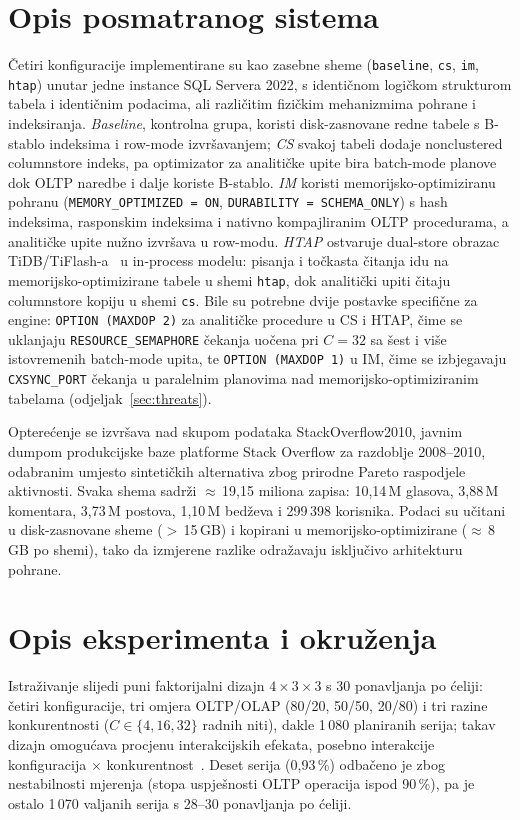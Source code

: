 \documentclass[10pt,conference,a4paper]{IEEEtran}
\begin{document}
\section{Opis posmatranog sistema}
Četiri konfiguracije implementirane su kao zasebne sheme (\texttt{baseline},
\texttt{cs}, \texttt{im}, \texttt{htap}) unutar jedne instance SQL Servera
2022, s identičnom logičkom strukturom tabela i identičnim podacima, ali
različitim fizičkim mehanizmima pohrane i indeksiranja. \emph{Baseline},
kontrolna grupa, koristi disk-zasnovane redne tabele s B-stablo indeksima i
row-mode izvršavanjem; \emph{CS} svakoj tabeli dodaje nonclustered
columnstore indeks, pa optimizator za analitičke upite bira batch-mode
planove dok OLTP naredbe i dalje koriste B-stablo. \emph{IM} koristi
memorijsko-optimiziranu pohranu (\texttt{MEMORY\_OPTIMIZED = ON},
\texttt{DURABILITY = SCHEMA\_ONLY}) s hash indeksima, rasponskim indeksima i
nativno kompajliranim OLTP procedurama, a analitičke upite nužno izvršava u
row-modu. \emph{HTAP} ostvaruje dual-store obrazac TiDB/TiFlash-a~\cite{huang2020}
u in-process modelu: pisanja i točkasta čitanja idu na
memorijsko-optimizirane tabele u shemi \texttt{htap}, dok analitički upiti
čitaju columnstore kopiju u shemi \texttt{cs}. Bile su potrebne dvije
postavke specifične za engine: \texttt{OPTION (MAXDOP 2)} za analitičke
procedure u CS i HTAP, čime se uklanjaju \texttt{RESOURCE\_SEMAPHORE}
čekanja uočena pri $C = 32$ sa šest i više istovremenih batch-mode upita, te
\texttt{OPTION (MAXDOP 1)} u IM, čime se izbjegavaju \texttt{CXSYNC\_PORT}
čekanja u paralelnim planovima nad memorijsko-optimiziranim tabelama
(odjeljak~\ref{sec:threats}).

Opterećenje se izvršava nad skupom podataka StackOverflow2010, javnim dumpom
produkcijske baze platforme Stack Overflow za razdoblje 2008--2010, odabranim
umjesto sintetičkih alternativa zbog prirodne Pareto raspodjele
aktivnosti.
Svaka shema sadrži $\approx$\,19,15 miliona zapisa: 10,14\,M glasova,
3,88\,M komentara, 3,73\,M postova, 1,10\,M bedževa i 299\,398 korisnika. Podaci su učitani u disk-zasnovane sheme ($>$\,15\,GB) i kopirani
u memorijsko-optimizirane ($\approx$\,8\,GB po shemi), tako da izmjerene razlike
odražavaju isključivo arhitekturu pohrane.

\section{Opis eksperimenta i okruženja}
Istraživanje slijedi puni faktorijalni dizajn $4\times3\times3$ s 30
ponavljanja po ćeliji: četiri konfiguracije, tri omjera OLTP/OLAP (80/20,
50/50, 20/80) i tri razine konkurentnosti ($C \in \{4, 16, 32\}$ radnih
niti), dakle 1\,080 planiranih serija; takav dizajn omogućava procjenu
interakcijskih efekata, posebno interakcije konfiguracija $\times$
konkurentnost~\cite{zhang2024hybench}. Deset serija (0,93\,\%) odbačeno je
zbog nestabilnosti mjerenja (stopa uspješnosti OLTP operacija ispod
90\,\%), pa je ostalo 1\,070 valjanih serija s 28--30 ponavljanja po
ćeliji.
\end{document}
